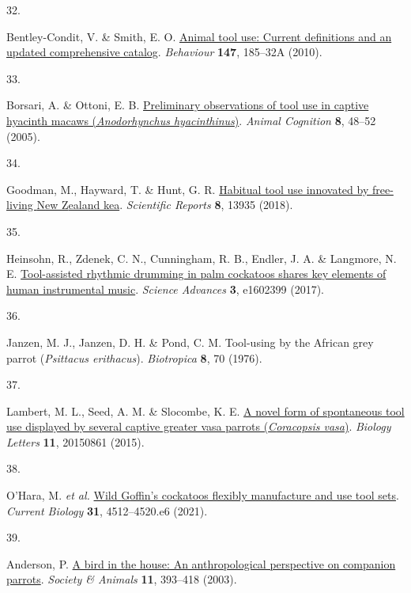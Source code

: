\documentclass[
  man,floatsintext]{apa6}
\newlength{\cslhangindent}
\newlength{\csllabelwidth}
\newlength{\cslentryspacingunit} %
\newenvironment{CSLReferences}[2] %
 {%
  \setlength{\parindent}{0pt}
  \ifodd #1
  \let\oldpar\par
  \def\par{\hangindent=\cslhangindent\oldpar}
  \fi
  \setlength{\parskip}{#2\cslentryspacingunit}
 }%
 {}
\newcommand{\CSLLeftMargin}[1]{\parbox[t]{\csllabelwidth}{#1}}
\newcommand{\CSLRightInline}[1]{\parbox[t]{\linewidth - \csllabelwidth}{#1}\break}
\begin{document}
\begin{CSLReferences}{0}{0}
\leavevmode{}%
\CSLLeftMargin{32. }%
\CSLRightInline{Bentley-Condit, V. \& Smith, E. O. \href{https://doi.org/10.1163/000579509X12512865686555}{Animal tool use: Current definitions and an updated comprehensive catalog}. \emph{Behaviour} \textbf{147}, 185--32A (2010).}

\leavevmode{}%
\CSLLeftMargin{33. }%
\CSLRightInline{Borsari, A. \& Ottoni, E. B. \href{https://doi.org/10.1007/s10071-004-0221-3}{Preliminary observations of tool use in captive hyacinth macaws (\emph{{A}nodorhynchus hyacinthinus})}. \emph{Animal Cognition} \textbf{8}, 48--52 (2005).}

\leavevmode{}%
\CSLLeftMargin{34. }%
\CSLRightInline{Goodman, M., Hayward, T. \& Hunt, G. R. \href{https://doi.org/10.1038/s41598-018-32363-9}{Habitual tool use innovated by free-living {N}ew {Z}ealand kea}. \emph{Scientific Reports} \textbf{8}, 13935 (2018).}

\leavevmode{}%
\CSLLeftMargin{35. }%
\CSLRightInline{Heinsohn, R., Zdenek, C. N., Cunningham, R. B., Endler, J. A. \& Langmore, N. E. \href{https://doi.org/10.1126/sciadv.1602399}{Tool-assisted rhythmic drumming in palm cockatoos shares key elements of human instrumental music}. \emph{Science Advances} \textbf{3}, e1602399 (2017).}

\leavevmode{}%
\CSLLeftMargin{36. }%
\CSLRightInline{Janzen, M. J., Janzen, D. H. \& Pond, C. M. Tool-using by the {A}frican grey parrot (\emph{{P}sittacus erithacus}). \emph{Biotropica} \textbf{8}, 70 (1976).}

\leavevmode{}%
\CSLLeftMargin{37. }%
\CSLRightInline{Lambert, M. L., Seed, A. M. \& Slocombe, K. E. \href{https://doi.org/10.1098/rsbl.2015.0861}{A novel form of spontaneous tool use displayed by several captive greater vasa parrots (\emph{{C}oracopsis vasa})}. \emph{Biology Letters} \textbf{11}, 20150861 (2015).}

\leavevmode{}%
\CSLLeftMargin{38. }%
\CSLRightInline{O'Hara, M. \emph{et al.} \href{https://doi.org/10.1016/j.cub.2021.08.009}{Wild {G}offin's cockatoos flexibly manufacture and use tool sets}. \emph{Current Biology} \textbf{31}, 4512--4520.e6 (2021).}

\leavevmode{}%
\CSLLeftMargin{39. }%
\CSLRightInline{Anderson, P. \href{https://doi.org/10.1163/156853003322796109}{A bird in the house: An anthropological perspective on companion parrots}. \emph{Society \& Animals} \textbf{11}, 393--418 (2003).}


\end{CSLReferences}
\end{document}
